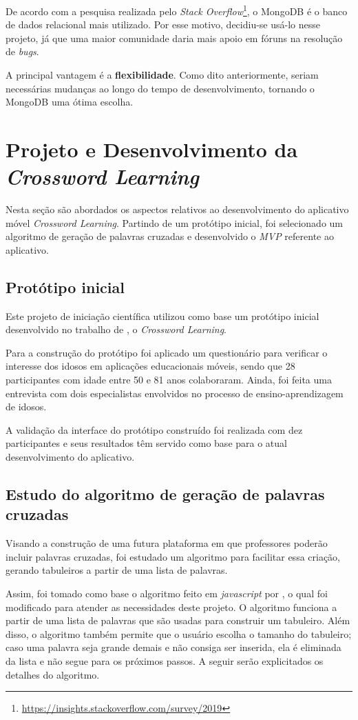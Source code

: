 De acordo com a pesquisa realizada pelo \textit{Stack Overflow}\footnote{\url{https://insights.stackoverflow.com/survey/2019}}, o MongoDB é o banco de dados relacional mais utilizado. Por esse motivo, decidiu-se usá-lo nesse projeto, já que uma maior comunidade daria mais apoio em fóruns na resolução de \textit{bugs}.

A principal vantagem é a \textbf{flexibilidade}. Como dito anteriormente, seriam necessárias mudanças ao longo do tempo de desenvolvimento, tornando o MongoDB uma ótima escolha.

\section{Projeto e Desenvolvimento da \textit{Crossword Learning}}
Nesta seção são abordados os aspectos relativos ao desenvolvimento do aplicativo móvel \textit{Crossword Learning}. Partindo de um protótipo inicial, foi selecionado um algoritmo de geração de palavras cruzadas e desenvolvido o \textit{MVP} referente ao aplicativo.

\subsection{Protótipo inicial}
\label{subsec:prototipoInicial}
Este projeto de iniciação científica utilizou como base um protótipo inicial desenvolvido no trabalho de \cite{oliveira2018crossword}, o \textit{Crossword Learning}.

Para a construção do protótipo foi aplicado um questionário para verificar o interesse dos idosos em aplicações educacionais móveis, sendo que 28 participantes com idade entre 50 e 81 anos colaboraram. Ainda, foi feita uma entrevista com dois especialistas envolvidos no processo de ensino-aprendizagem de idosos.

A validação da interface do protótipo construído foi realizada com dez participantes e seus resultados têm servido como base para o atual desenvolvimento do aplicativo. 

\subsection{Estudo do algoritmo de geração de palavras cruzadas}
Visando a construção de uma futura plataforma em que professores poderão incluir palavras cruzadas, foi estudado um algoritmo para facilitar essa criação, gerando tabuleiros a partir de uma lista de palavras.

Assim, foi tomado como base o algoritmo feito em \textit{javascript} por \cite{layoutGenerator}, o qual foi modificado para atender as necessidades deste projeto. O algoritmo funciona a partir de uma lista de palavras que são usadas para construir um tabuleiro. Além disso, o algoritmo também permite que o usuário escolha o tamanho do tabuleiro; caso uma palavra seja grande demais e não consiga ser inserida, ela é eliminada da lista e não segue para os próximos passos. A seguir serão explicitados os detalhes do algoritmo.

